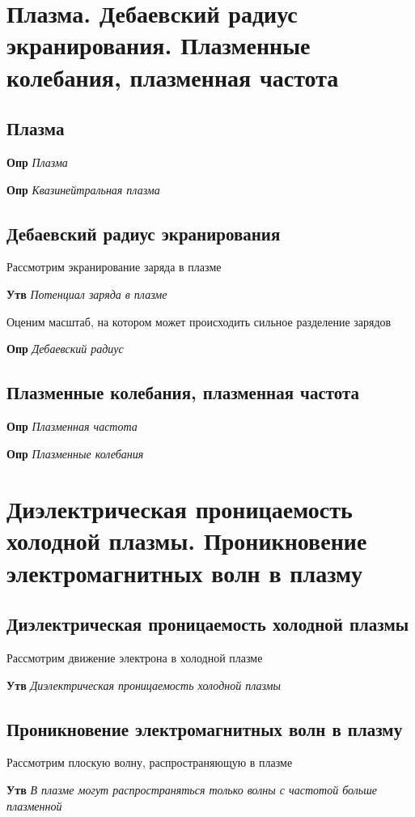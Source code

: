 \documentclass[a4paper, 14pt]{article}
\begin{document}
    \section{Плазма.
    Дебаевский радиус экранирования.
    Плазменные колебания, плазменная частота}
    
    \subsection{Плазма}
    
    \textbf{Опр} \textit{Плазма}
    
    \textbf{Опр} \textit{Квазинейтральная плазма}
    
    \subsection{Дебаевский радиус экранирования}
    
    Рассмотрим экранирование заряда в плазме
    
    \textbf{Утв} \textit{Потенциал заряда в плазме}
    
    Оценим масштаб, на котором может происходить сильное разделение зарядов
    
    \textbf{Опр} \textit{Дебаевский радиус}
    
    \subsection{Плазменные колебания, плазменная частота}
    
    \textbf{Опр} \textit{Плазменная частота}
    
    \textbf{Опр} \textit{Плазменные колебания}
    
    \section{Диэлектрическая проницаемость холодной плазмы.
    Проникновение электромагнитных волн в плазму}
    
    \subsection{Диэлектрическая проницаемость холодной плазмы}
    
    Рассмотрим движение электрона в холодной плазме
    
    \textbf{Утв} \textit{Диэлектрическая проницаемость холодной плазмы}
    
    \subsection{Проникновение электромагнитных волн в плазму}
    
    Рассмотрим плоскую волну, распространяющую в плазме
    
    \textbf{Утв} \textit{В плазме могут распространяться только волны с частотой больше плазменной}
\end{document}
